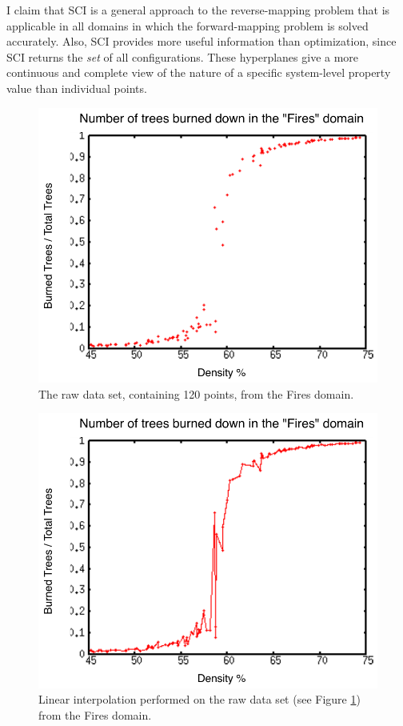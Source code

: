 I claim that SCI is a general approach to the reverse-mapping problem that is applicable in all domains in which the forward-mapping problem is solved accurately.
Also, SCI provides more useful information than optimization, since SCI returns the \textit{set} of all configurations.
These hyperplanes give a more continuous and complete view of the nature of a specific system-level property value than individual points.




\begin{figure}[ht]
\centering
\includegraphics[scale=.66666667]{images/rii0.pdf}
\caption{The raw data set, containing 120 points, from the Fires domain.}
\label{fig:rii0}
\end{figure}

\begin{figure}[ht]
\centering
\includegraphics[scale=.66666667]{images/rii1.pdf}
\caption{Linear interpolation performed on the raw data set (see Figure \ref{fig:rii0}) from the Fires domain.}
\label{fig:rii1}
\end{figure}

